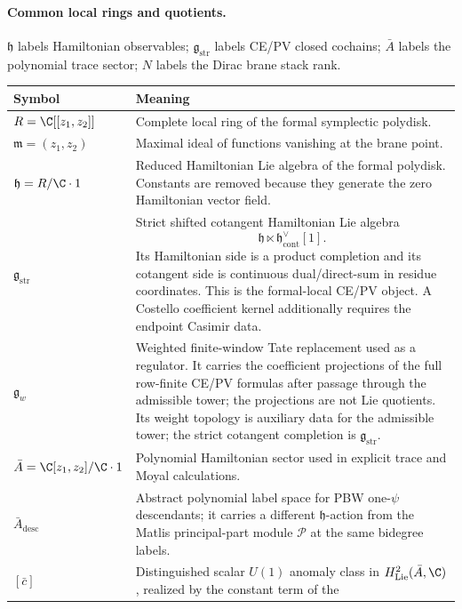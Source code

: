 \paragraph{Common local rings and quotients.}
\(\mathfrak h\) labels Hamiltonian observables;
\(\mathfrak g_{\mathrm{str}}\) labels CE/PV closed cochains;
\(\bar A\) labels the polynomial trace sector; \(N\) labels the Dirac
brane stack rank.
\begin{center}
\begin{tabular}{@{}>{\raggedright\arraybackslash}p{}
  >{\raggedright\arraybackslash}p{}@{}}
\hline
\textbf{Symbol} & \textbf{Meaning}\\
\hline
\(R=\C[[z_1,z_2]]\) &
Complete local ring of the formal symplectic polydisk.\\
\hline
\(\mathfrak m=(z_1,z_2)\) &
Maximal ideal of functions vanishing at the brane point.\\
\hline
\(\mathfrak h=R/\C\cdot1\) &
Reduced Hamiltonian Lie algebra of the formal polydisk. Constants are
removed because they generate the zero Hamiltonian vector field.\\
\hline
\(\mathfrak g_{\mathrm{str}}\) &
Strict shifted cotangent Hamiltonian Lie algebra
\[
  \mathfrak h\ltimes\mathfrak h^\vee_{\mathrm{cont}}[1].
\]
Its Hamiltonian side is a product completion and its cotangent side is
continuous dual/direct-sum in residue coordinates.  This is the
formal-local CE/PV object.  A Costello coefficient kernel additionally
requires the endpoint Casimir data.\\
\hline
\(\mathfrak g_w\) &
Weighted finite-window Tate replacement used as a regulator.  It carries
the coefficient projections of the full row-finite CE/PV formulas after
passage through the admissible tower; the projections are not Lie
quotients.  Its weight topology is auxiliary data for the
admissible tower; the strict cotangent completion is
\(\mathfrak g_{\mathrm{str}}\).\\
\hline
\(\bar A=\C[z_1,z_2]/\C\cdot1\) &
Polynomial Hamiltonian sector used in explicit trace and Moyal
calculations.\\
\hline
\(\bar A_{\mathrm{desc}}\) &
Abstract polynomial label space for PBW one-\(\psi\) descendants; it
carries a different \(\mathfrak h\)-action from the Matlis
principal-part module \(\mathcal P\) at the same bidegree labels.\\
\hline
\([\bar c]\) &
Distinguished scalar \(U(1)\) anomaly class in
\(H^2_{\mathrm{Lie}}(\bar A,\C)\), realized by the constant term of the

\end{tabular}
\end{center}

